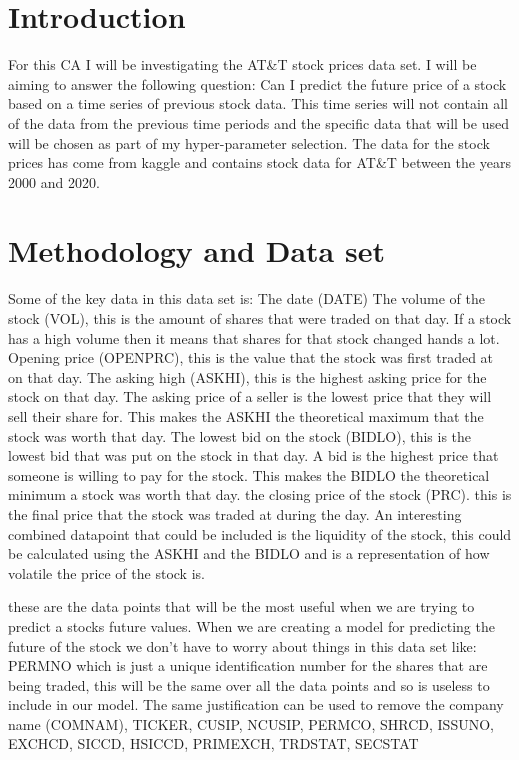 \documentclass{report}
\begin{document}
\section{Introduction}
For this CA I will be investigating the AT\&T stock prices data set.
I will be aiming to answer the following question: Can I predict the future price of a stock based on a time series of previous stock data.
This time series will not contain all of the data from the previous time periods and the specific data that will be used will be chosen as part of my hyper-parameter selection.
The data for the stock prices has come from kaggle and contains stock data for AT\&T between the years 2000 and 2020.

\section{Methodology and Data set}
Some of the key data in this data set is: The date (DATE)
The volume of the stock (VOL), this is the amount of shares that were traded on that day. If a stock has a high volume then it means that shares for that stock changed hands a lot.
Opening price (OPENPRC), this is the value that the stock was first traded at on that day.
The asking high (ASKHI), this is the highest asking price for the stock on that day. The asking price of a seller is the lowest price that they will sell their share for. This makes the ASKHI the theoretical maximum that the stock was worth that day.
The lowest bid on the stock (BIDLO), this is the lowest bid that was put on the stock in that day. A bid is the highest price that someone is willing to pay for the stock. This makes the BIDLO the theoretical minimum a stock was worth that day.
the closing price of the stock (PRC). this is the final price that the stock was traded at during the day.
An interesting combined datapoint that could be included is the liquidity of the stock, this could be calculated using the ASKHI and the BIDLO and is a representation of how volatile the price of the stock is.

these are the data points that will be the most useful when we are trying to predict a stocks future values.
When we are creating a model for predicting the future of the stock we don't have to worry about things in this data set like:
PERMNO which is just a unique identification number for the shares that are being traded, this will be the same over all the data points and so is useless to include in our model.
The same justification can be used to remove the company name (COMNAM), TICKER, CUSIP, NCUSIP, PERMCO, SHRCD, ISSUNO, EXCHCD, SICCD, HSICCD, PRIMEXCH, TRDSTAT, SECSTAT
\end{document}
